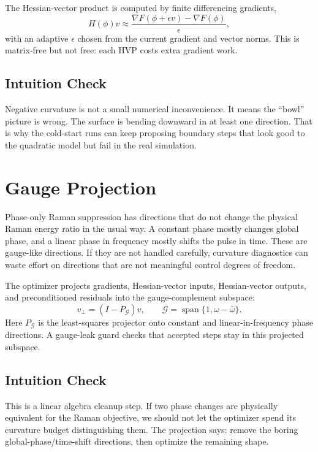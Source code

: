 \documentclass[11pt]{article}
\begin{document}
The Hessian-vector product is computed by finite differencing gradients,
\[
    H(\phi)v
    \approx
    \frac{\nabla F(\phi+\epsilon v)-\nabla F(\phi)}{\epsilon},
\]
with an adaptive \(\epsilon\) chosen from the current gradient and vector
norms. This is matrix-free but not free: each HVP costs extra gradient work.

\subsection*{Intuition Check}

Negative curvature is not a small numerical inconvenience. It means the
``bowl'' picture is wrong. The surface is bending downward in at least one
direction. That is why the cold-start runs can keep proposing boundary steps
that look good to the quadratic model but fail in the real simulation.

\section{Gauge Projection}

Phase-only Raman suppression has directions that do not change the physical
Raman energy ratio in the usual way. A constant phase mostly changes global
phase, and a linear phase in frequency mostly shifts the pulse in time. These
are gauge-like directions. If they are not handled carefully, curvature
diagnostics can waste effort on directions that are not meaningful control
degrees of freedom.

The optimizer projects gradients, Hessian-vector inputs, Hessian-vector
outputs, and preconditioned residuals into the gauge-complement subspace:
\[
    v_{\perp}=(I-P_{\mathcal{G}})v,
    \qquad
    \mathcal{G}=\operatorname{span}\{1,\omega-\bar{\omega}\}.
\]
Here \(P_{\mathcal{G}}\) is the least-squares projector onto constant and
linear-in-frequency phase directions. A gauge-leak guard checks that accepted
steps stay in this projected subspace.

\subsection*{Intuition Check}

This is a linear algebra cleanup step. If two phase changes are physically
equivalent for the Raman objective, we should not let the optimizer spend its
curvature budget distinguishing them. The projection says: remove the boring
global-phase/time-shift directions, then optimize the remaining shape.
\end{document}
